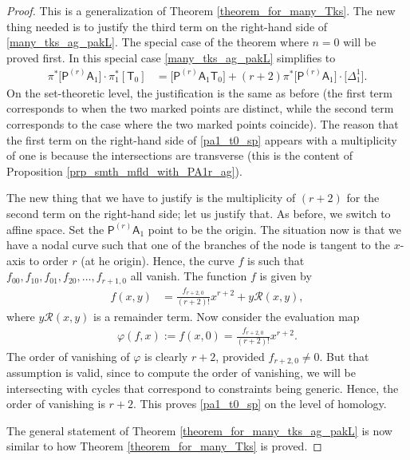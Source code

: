 \documentclass[pdftex]{sigma}
\numberwithin{equation}{section}
\begin{document}
\begin{proof}
This is a generalization of Theorem \ref{theorem_for_many_Tks}.
The new thing needed is to justify the third term on the right-hand side of \eqref{many_tks_ag_pakL}.
The special case of the theorem where $n = 0$ will be proved first. In this special case
\eqref{many_tks_ag_pakL} simplifies to
\begin{align}
\pi^*\bigl[\mathsf{P}^{(r)}\mathsf{A}_1\bigr] \cdot \pi_1^*[\mathsf{T}_0] &  =  \bigl[\mathsf{P}^{(r)}\mathsf{A}_1 \mathsf{T}_0\bigr] +
(r+2) \pi^*\bigl[\mathsf{P}^{(r)}\mathsf{A}_1\bigr]\cdot \bigl[\Delta_{1}^1\bigr]. \label{pa1_t0_sp}
\end{align}
On the set-theoretic level, the justification is the same as before
(the first term corresponds to when the two marked points are distinct, while the
second term corresponds to the case where the two marked points coincide).
The reason that
the first term on the right-hand side of \eqref{pa1_t0_sp}
appears with a multiplicity of one is because the intersections are transverse
(this is the content of Proposition \ref{prp_smth_mfld_with_PA1r_ag}).

The new thing that we have to justify is the multiplicity of $(r+2)$
for the second term on the right-hand side; let us justify that.
As before, we switch to affine space.
Set the $\mathsf{P}^{(r)}\mathsf{A}_1$ point to
be the origin.
The situation now is that we have a nodal curve such that one of the branches of the node is tangent to
the $x$-axis to order $r$ (at he origin).
Hence, the curve $f$ is such that~${f_{00}, f_{10}, f_{01}, f_{20},\dots, f_{r+1, 0}}$ all vanish. The function
$f$ is given by
\begin{align*}
f(x, y)&  =  \frac{f_{r+2, 0}}{(r+2)!} x^{r+2} + y\mathcal{R}(x, y),
\end{align*}
where $y \mathcal{R}(x, y)$ is a remainder term. Now consider the evaluation map
\begin{align*}
\varphi(f, x) :=  f(x,0)  = \frac{f_{r+2, 0}}{(r+2)!} x^{r+2}.
\end{align*}
The order of vanishing of $\varphi$ is clearly $r+2$, provided
$f_{r+2, 0} \neq 0$. But that assumption is valid, since to compute the order of vanishing, we will be intersecting with
cycles that correspond to constraints being generic. Hence, the order of vanishing is $r+2$. This proves
\eqref{pa1_t0_sp} on the level of homology.

The general statement of Theorem \ref{theorem_for_many_tks_ag_pakL} is now similar to how Theorem \ref{theorem_for_many_Tks}
is proved.
\end{proof}
\end{document}
